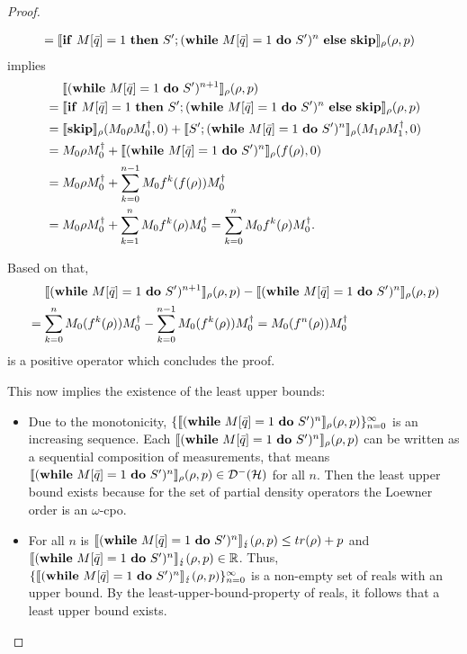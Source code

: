 \documentclass[a4paper,UKenglish,cleveref, autoref, thm-restate]{lipics-v2021}
\begin{document}
\begin{proof}
\begin{itemize}
\begin{claimproof}
\begin{itemize}
\begin{align*}
                &= \semanticsRho{\ifstatement{S'; (\while')^n}{\skipbf}}(\rho,p)
            \end{align*} implies
            \begin{align*}
                & \phantom{=.}\semanticsRho{(\while')^{n+1}}(\rho,p) \\
                &= \semanticsRho{\ifstatement{S'; (\while')^n}{\skipbf}}(\rho,p) \\
                &= \semanticsRho{\skipbf } (M_0 \rho M_0^\dagger,0) + \semanticsRho{S'; (\while')^n} (M_1 \rho M_1 ^\dagger,0) \\
                &= M_0 \rho M_0^\dagger + \semanticsRho{(\while')^n}(f(\rho),0)\\
                &= M_0 \rho M_0^\dagger + \sum_{k=0}^{n-1} M_0 f^k(f(\rho)) M_0 ^\dagger\\
                &= M_0 \rho M_0^\dagger + \sum_{k=1}^{n} M_0 f^k(\rho) M_0 ^\dagger=  \sum_{k=0}^{n} M_0 f^k(\rho) M_0 ^\dagger.
            \end{align*}
            \end{itemize}

            Based on that,
            \begin{align*}
                &\phantom{=.}\semanticsRho{(\while')^{n+1}}(\rho,p) - \semanticsRho{(\while')^{n}}(\rho,p) \\
                &= \sum_{k=0}^{n} M_0 (f^k(\rho)) M_0 ^\dagger - \sum_{k=0}^{n-1} M_0 (f^k(\rho)) M_0 ^\dagger = M_0 (f^n(\rho)) M_0^\dagger
            \end{align*}
            is a positive operator which concludes the proof.
        \end{claimproof}

        This now implies the existence of the least upper bounds:
        \begin{itemize}
            \item Due to the monotonicity, $\{\semanticsRho{(\while')^n} (\rho,p)\}_{n=0}^\infty$ is an increasing sequence. Each $\semanticsRho{(\while')^n} (\rho,p)$ can be written as a sequential composition of measurements, that means $\semanticsRho{(\while')^n} (\rho,p)\in \density$ for all $n$. Then the least upper bound exists because for the set of partial density operators the Loewner order is an $\omega$-cpo.
            \item For all $n$ is $\semanticsErr{(\while')^n} (\rho,p) \leq tr(\rho)+p$ and $\semanticsErr{(\while')^n} (\rho,p) \in \mathbb{R}$. Thus, $\{ \semanticsErr{(\while')^n} (\rho,p) \}_{n=0}^\infty$ is a non-empty set of reals with an upper bound. By the least-upper-bound-property of reals, it follows that a least upper bound exists.
        \end{itemize}


\end{itemize}
\end{proof}
\end{document}

